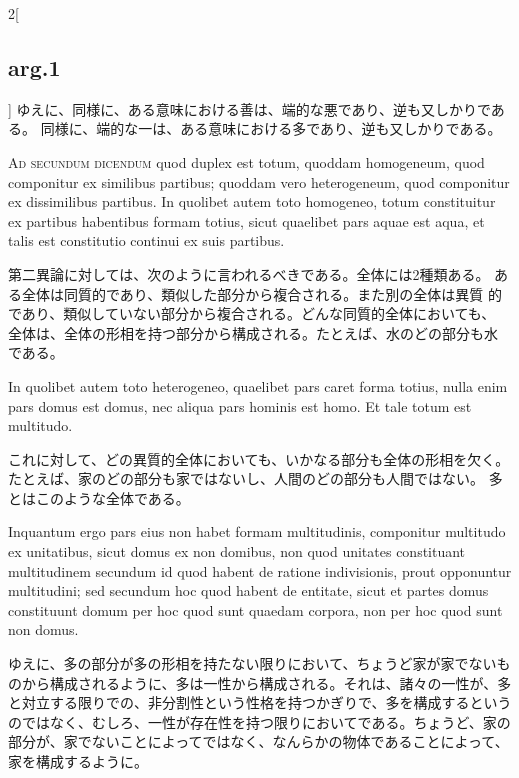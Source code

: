 \documentclass[paper=a4paper,fontsize=10pt,jafontsize=9pt,titlepage]{jlreq}
\begin{document}
\begin{paracol}{2}[\subsection{arg.1}]
ゆえに、同様に、ある意味における善は、端的な悪であり、逆も又しかりである。
同様に、端的な一は、ある意味における多であり、逆も又しかりである。

\switchcolumn*[\subsection{ad.2}]

{\scshape Ad secundum dicendum} quod duplex est totum, quoddam homogeneum, quod
componitur ex similibus partibus; quoddam vero heterogeneum, quod
componitur ex dissimilibus partibus. In quolibet autem toto homogeneo,
totum constituitur ex partibus habentibus formam totius, sicut quaelibet
pars aquae est aqua, et talis est constitutio continui ex suis
partibus.

\switchcolumn

第二異論に対しては、次のように言われるべきである。全体には2種類ある。
ある全体は同質的であり、類似した部分から複合される。また別の全体は異質
的であり、類似していない部分から複合される。どんな同質的全体においても、
全体は、全体の形相を持つ部分から構成される。たとえば、水のどの部分も水
である。

\switchcolumn*

In quolibet autem toto heterogeneo, quaelibet pars caret forma
totius, nulla enim pars domus est domus, nec aliqua pars hominis est
homo. Et tale totum est multitudo.

\switchcolumn

これに対して、どの異質的全体においても、いかなる部分も全体の形相を欠く。
たとえば、家のどの部分も家ではないし、人間のどの部分も人間ではない。
多とはこのような全体である。

\switchcolumn*

Inquantum ergo pars eius non habet formam multitudinis, componitur
multitudo ex unitatibus, sicut domus ex non domibus, non quod unitates
constituant multitudinem secundum id quod habent de ratione
indivisionis, prout opponuntur multitudini; sed secundum hoc quod
habent de entitate, sicut et partes domus constituunt domum per hoc
quod sunt quaedam corpora, non per hoc quod sunt non domus.

\switchcolumn

ゆえに、多の部分が多の形相を持たない限りにおいて、ちょうど家が家でないも
のから構成されるように、多は一性から構成される。それは、諸々の一性が、多
と対立する限りでの、非分割性という性格を持つかぎりで、多を構成するという
のではなく、むしろ、一性が存在性を持つ限りにおいてである。ちょうど、家の
部分が、家でないことによってではなく、なんらかの物体であることによって、
家を構成するように。


\end{paracol}
\end{document}
